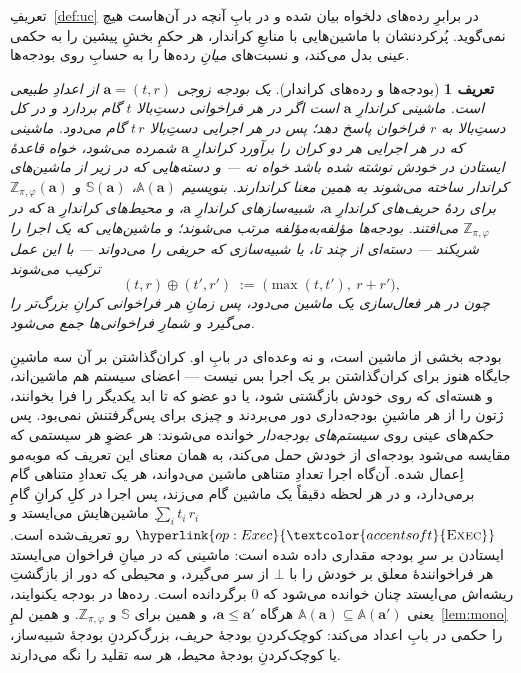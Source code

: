 \documentclass[10pt,oneside,openany]{book}
\newcommand{\bd}[1]{\mathbf{#1}}
\newcommand{\Aset}{\mathbb{A}}
\newcommand{\SimSet}{\mathbb{S}}
\newcommand{\ZenvSet}{\mathbb{Z}}
\newcommand{\op}[1]{\textnormal{\textsc{#1}}}
\newcommand{\opl}[1]{\hyperlink{op:#1}{\textcolor{accentsoft}{\op{#1}}}}
\newcommand{\none}{\bot}
\theoremstyle{accentdef}
\newtheorem{definition}{تعریف}[chapter]
\theoremstyle{accentplain}
\begin{document}
تعریفِ~\ref{def:uc} در برابرِ رده‌های دلخواه بیان شده و در بابِ آنچه در
آن‌هاست هیچ نمی‌گوید. پُرکردنشان با ماشین‌هایی با منابعِ کراندار، هر حکمِ
بخشِ پیشین را به حکمی عینی بدل می‌کند، و نسبت‌های \emph{میانِ} رده‌ها را به
حسابِ روی بودجه‌ها.

\begin{definition}[بودجه‌ها و رده‌های کراندار]\label{def:res}
یک \emph{بودجه} زوجی $\bd{a} = (t,r)$ از اعدادِ طبیعی است. ماشینی
\emph{کراندارِ $\bd{a}$} است اگر در هر فراخوانی دستِ‌بالا $t$ گام بردارد و
در کل دستِ‌بالا به $r$ فراخوان پاسخ دهد؛ پس در هر اجرایی دستِ‌بالا $t\,r$
گام می‌دود. ماشینی که در هر اجرایی هر دو کران را برآورد کراندارِ $\bd{a}$
شمرده می‌شود، خواه قاعدهٔ ایستادن در خودش نوشته شده باشد خواه نه --- و
دسته‌هایی که در زیر از ماشین‌های کراندار ساخته می‌شوند به همین معنا
کراندارند. بنویسیم $\Aset(\bd{a})$، $\SimSet(\bd{a})$ و
$\ZenvSet_{\pi,\varphi}(\bd{a})$ برای ردهٔ حریف‌های کراندارِ $\bd{a}$،
شبیه‌سازهای کراندارِ $\bd{a}$، و محیط‌های کراندارِ $\bd{a}$ که در
$\ZenvSet_{\pi,\varphi}$ می‌افتند. بودجه‌ها مؤلفه‌به‌مؤلفه مرتب می‌شوند؛ و
ماشین‌هایی که یک اجرا را شریکند --- دسته‌ای از چند تا، یا شبیه‌سازی که
حریفی را می‌دواند --- با این عمل ترکیب می‌شوند
\[
  (t,r) \oplus (t',r') \;:=\; \bigl(\max(t,t'),\ r + r'\bigr) ,
\]
چون در هر فعال‌سازی یک ماشین می‌دود، پس زمانِ هر فراخوانی کرانِ بزرگ‌تر را
می‌گیرد و شمارِ فراخوانی‌ها جمع می‌شود.
\end{definition}

بودجه بخشی از ماشین است، و نه وعده‌ای در بابِ او. کران‌گذاشتن بر آن سه
ماشینِ جایگاه هنوز برای کران‌گذاشتن بر یک اجرا بس نیست --- اعضای سیستم هم
ماشین‌اند، و هسته‌ای که روی خودش بازگشتی شود، یا دو عضو که تا ابد یکدیگر
را فرا بخوانند، ژتون را از هر ماشینِ بودجه‌داری دور می‌بردند و چیزی برای
پس‌گرفتنش نمی‌بود. پس حکم‌های عینی روی \emph{سیستم‌های بودجه‌دار} خوانده
می‌شوند: هر عضوِ هر سیستمی که مقایسه می‌شود بودجه‌ای از خودش حمل می‌کند، به
همان معنای این تعریف که مو‌به‌مو اِعمال شده. آن‌گاه اجرا تعدادِ متناهی
ماشین می‌دواند، هر یک تعدادِ متناهی گام برمی‌دارد، و در هر لحظه دقیقاً یک
ماشین گام می‌زند، پس اجرا در کلِ کرانِ گامِ $\sum_i t_i\,r_i$ِ ماشین‌هایش
می‌ایستد و $\opl{Exec}$ رو تعریف‌شده است. ایستادن بر سرِ بودجه مقداری
داده شده است: ماشینی که در میانِ فراخوان می‌ایستد هر فراخوانندهٔ معلق بر
خودش را با $\none$ از سر می‌گیرد، و محیطی که دور از بازگشتِ ریشه‌اش
می‌ایستد چنان خوانده می‌شود که $0$ برگردانده است. رده‌ها در بودجه
یکنوایند، یعنی $\Aset(\bd{a}) \subseteq \Aset(\bd{a}')$ هرگاه $\bd{a} \leq
\bd{a}'$، و همین برای $\SimSet$ و $\ZenvSet_{\pi,\varphi}$. و همین
لمِ~\ref{lem:mono} را حکمی در بابِ اعداد می‌کند: کوچک‌کردنِ بودجهٔ حریف،
بزرگ‌کردنِ بودجهٔ شبیه‌ساز، یا کوچک‌کردنِ بودجهٔ محیط، هر سه تقلید را نگه
می‌دارند.
\end{document}
